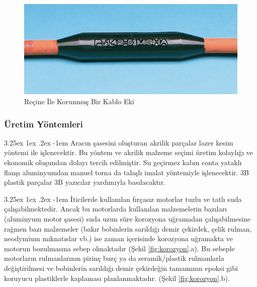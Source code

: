 \documentclass[12pt]{article}
\makeatletter
\renewcommand\paragraph{\@startsection{paragraph}{5}{\z@}%
  {3.25ex \@plus1ex \@minus.2ex}%
  {-1em}%
  {\normalfont\normalsize\bfseries}}
\makeatother
\begin{document}
\newpage

\begin{figure}[hbt!]
\centering
 \begin{adjustbox}{width=10cm}
\includegraphics[width=1\textwidth]{inlinesplice.jpg}
 \end{adjustbox}
\caption{Reçine İle Korunmuş Bir Kablo Eki}
\label{fig:inlinesplice}
\end{figure}

\subsubsection{Üretim Yöntemleri}

\paragraph{} Aracın şasesini oluşturan akrilik parçalar lazer kesim yöntemi ile işlenecektir. Bu yöntem ve akrilik malzeme seçimi üretim kolaylığı ve ekonomik oluşundan dolayı tercih edilmiştir. Su geçirmez kabın conta yataklı flanşı aluminyumdan manuel torna da talaşlı imalat yöntemiyle işlenecektir. 3B plastik parçalar 3B yazıcılar yardımıyla basılacaktır.

\paragraph{} İticilerde kullanılan fırçasız motorlar tuzlu ve tatlı suda çalışabilmektedir. Ancak bu motorlarda kullanılan malzemelerin bazıları (aluminyum motor şasesi) suda uzun süre korozyona uğramadan çalışabilmesine rağmen bazı malzemeler (bakır bobinlerin sarıldığı demir çekirdek, çelik rulman, neodymium mıknatıslar vb.) ise zaman içerisinde korozyona uğramakta ve motorun bozulmasına sebep olmaktadır (Şekil \ref{fig:korozyon}.a). Bu sebeple motorların rulmanlarının pirinç burç ya da seramik/plastik rulmanlarla değiştirilmesi ve bobinlerin sarıldığı demir çekirdeğin tamamının epoksi gibi koruyucu plastiklerle kaplaması planlanmaktadır. (Şekil \ref{fig:korozyon}.b). 
\end{document}
